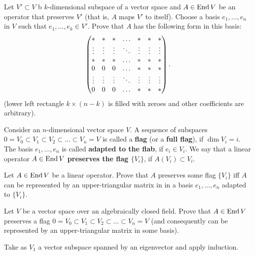 \documentclass[12pt]{article}
\begin{document}


\begin{zadacha}
Let  $V' \subset V$ b $k$-dimensional subspace of a vector space and
$A\in \operatorname{End} V$ be an operator that preserves $V'$ (that is, $A$ maps 
$V'$ to itself). Choose a basis $e_1, \dots, e_n$ in $V$ such that
$e_1, \dots, e_k\in V'$. Prove that $A$ has the following form in this
basis:
\[
\begin{pmatrix}
*&*&* &\hdotsfor{1} &*&*&*\\
\vdots&\vdots&\vdots&
\ddots&\vdots&\vdots&\vdots\\
*&*&* &\hdotsfor{1} &*&*&*\\
0&0&0 &\hdotsfor{1} &*&*&*\\
\vdots&\vdots&\vdots&
\ddots &\vdots&\vdots&\vdots\\
0&0&0 &\hdotsfor{1} &*&*&*
\end{pmatrix}.
\]
(lower left rectangle $k\times (n-k)$ is filled with zeroes and other
coefficients are  arbitrary).
\end{zadacha}

\begin{opredelenie}
Consider an $n$-dimensional vector space $V$.
A sequence of subspaces
$0=V_0 \subset V_1 \subset V_2 \subset \dots \subset V_n = V$
is called a  {\bf flag} (or a  {\bf full flag}),
if $\dim V_i = i$. The basis $e_1, \dots, e_n$ is called 
{\bf adapted to the flab}, if $e_i \in V_i$.
We say that a linear operator  $A\in \operatorname{End} V$
{\bf preserves the flag $\{ V_i\}$}, if $A(V_i) \subset V_i$.
\end{opredelenie}

\begin{zadacha}[!]
  Let $A\in \operatorname{End} V$ be a linear operator. Prove that $A$ preserves
  some flag $\{ V_i\}$ iff $A$ can be represented by an
  upper-triangular matrix in in a basis $e_1, \dots,  e_n$ adapted to
  $\{ V_i \}$.
\end{zadacha}

\begin{zadacha}[!]
Let $V$ be a vector space over an algebraically closed field. Prove that
$A\in \operatorname{End} V$ preserves a flag
$0=V_0 \subset V_1 \subset V_2 \subset \dots \subset V_n = V$
(and consequently can be represented by an upper-triangular matrix in
some basis).
\end{zadacha}

\begin{ukazanie}
  Take as $V_1$ a vector subspace spanned by an eigenvector and apply
  induction.
\end{ukazanie}
\end{document}
